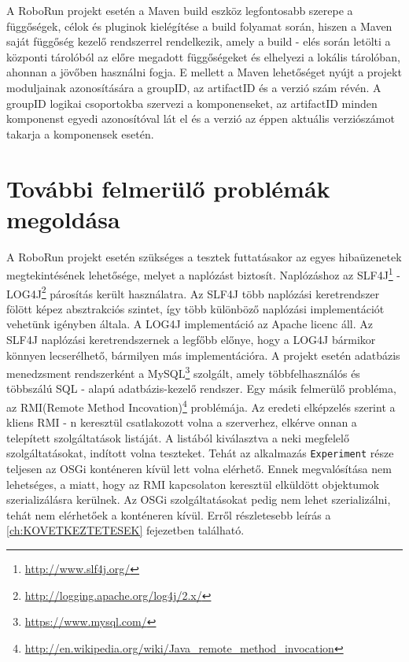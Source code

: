 	A RoboRun projekt esetén a Maven build eszköz legfontosabb szerepe a függőségek, célok és pluginok kielégítése a build folyamat során, hiszen a Maven saját függőség kezelő rendszerrel rendelkezik, amely  a build - elés során letölti a központi tárolóból az előre megadott függőségeket és elhelyezi a lokális tárolóban, ahonnan a jövőben használni fogja. E mellett a Maven lehetőséget nyújt a projekt moduljainak azonosítására a groupID, az artifactID és a verzió szám révén. A groupID logikai csoportokba szervezi a komponenseket, az artifactID minden komponenst egyedi azonosítóval lát el és a verzió az éppen aktuális verziószámot takarja a komponensek esetén.



\section{További felmerülő problémák megoldása}\label{sec:TovábbiProblemak}

	A RoboRun projekt esetén szükséges a tesztek futtatásakor az egyes hibaüzenetek megtekintésének lehetősége, melyet a naplózást biztosít. Naplózáshoz az SLF4J\footnote{\href {http://www.slf4j.org/}{http://www.slf4j.org/}} - LOG4J\footnote{\href {http://logging.apache.org/log4j/2.x/}{http://logging.apache.org/log4j/2.x/}} párosítás került használatra. Az SLF4J több naplózási keretrendszer fölött képez absztrakciós szintet, így több különböző naplózási implementációt vehetünk igényben általa. A LOG4J implementáció az Apache licenc áll. Az SLF4J naplózási keretrendszernek a legfőbb előnye, hogy a LOG4J bármikor könnyen lecserélhető, bármilyen más implementációra. 
	A projekt esetén adatbázis menedzsment rendszerként a MySQL\footnote{\href {https://www.mysql.com/}{https://www.mysql.com/}} szolgált, amely többfelhasználós és többszálú SQL - alapú adatbázis-kezelő rendszer. 
	Egy másik felmerülő probléma, az RMI(Remote Method Incovation)\footnote{\href {http://en.wikipedia.org/wiki/Java\_remote\_method\_invocation}{http://en.wikipedia.org/wiki/Java\_remote\_method\_invocation}} problémája. Az eredeti elképzelés szerint a kliens RMI - n keresztül csatlakozott volna a szerverhez, elkérve onnan a telepített szolgáltatások listáját. A listából kiválasztva a neki megfelelő szolgáltatásokat, indított volna teszteket. Tehát az alkalmazás \texttt{Experiment} része teljesen az OSGi konténeren kívül lett volna elérhető. Ennek megvalósítása nem lehetséges, a miatt, hogy az RMI kapcsolaton keresztül elküldött objektumok szerializálásra kerülnek. Az OSGi szolgáltatásokat pedig nem lehet szerializálni, tehát nem elérhetőek a konténeren kívül. Erről részletesebb leírás a \ref{ch:KOVETKEZTETESEK} fejezetben található.
	
	